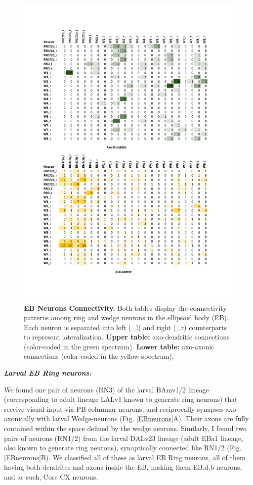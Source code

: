         \begin{figure}
            \centering
            \includegraphics[width=12cm]{Figs/CX/EBneuronsmatrix.pdf}
            \caption{\textbf{EB Neurons Connectivity.} Both tables display the connectivity patterns among ring and wedge neurons in the ellipsoid body (EB). Each neuron is separated into left (\_l) and right (\_r) counterparts to represent lateralization. \textbf{Upper table:} axo-dendritic connections (color-coded in the green spectrum). \textbf{Lower table:} axo-axonic connections (color-coded in the yellow spectrum).}
            \label{EBmatrix}
        \end{figure}



    \textbf{\textit{Larval EB Ring neurons:}}

    We found one pair of neurons (RN3) of the larval BAmv1/2 lineage (corresponding to adult lineage LALv1 known to generate ring neurons) that receive visual input via PB columnar neurons, and reciprocally synapses axo-axonically with larval Wedge-neurons (Fig. \ref{EBneurons}A).
    Their axons are fully contained within the space defined by the wedge neurons.
    Similarly, I found two pairs of neurons (RN1/2) from the larval DALv23 lineage (adult EBa1 lineage, also known to generate ring neurons), synaptically connected like RN1/2 (Fig. \ref{EBneurons}B). We classified all of these as larval EB Ring neurons, all of them having both dendrites and axons inside the EB, making them EB.d.b neurons, and as such, Core CX neurons. 

